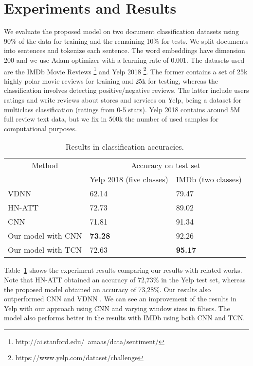 \documentclass[runningheads]{llncs}
\begin{document}
\section{Experiments and Results}
We evaluate the proposed model on two document classification datasets using 90\% of the data for training and the remaining 10\% for tests. We split documents into sentences and tokenize each sentence. The word embeddings have dimension 200 and we use Adam optimizer with a learning rate of 0.001. The datasets used are the IMDb Movie Reviews \footnote{http://ai.stanford.edu/~amaas/data/sentiment/} and Yelp 2018 \footnote{https://www.yelp.com/dataset/challenge}. The former contains a set of 25k highly polar movie reviews for training and 25k for testing, whereas the classification involves detecting positive/negative reviews. The latter include users ratings and write reviews about stores and services on Yelp, being a dataset for multiclass classification (ratings from 0-5 stars). Yelp 2018 contains around 5M full review text data, but we fix in 500k the number of used samples for computational purposes.\\[-12mm]

\begin{table}[!h]
\caption{Results in classification accuracies.}
\centering
\begin{tabular}{@{}p{}*{2}{p{}}@{}}
\toprule
\multicolumn{1}{c}{Method} & \multicolumn{2}{c}{Accuracy on test set}  \\
\cmidrule(r{4pt}){2-3} 
& Yelp 2018 (five classes) & IMDb (two classes)  \\
\midrule
VDNN \cite{c31} & 62.14 & 79.47 \\
HN-ATT  \cite{c1} & 72.73 &  89.02 \\
CNN  \cite{c13} & 71.81 &  91.34 \\
Our model with CNN & \textbf{73.28} & 92.26\\
Our model with TCN & 72.63 & \textbf{95.17} \\
\bottomrule
\end{tabular}
\label{tabela1}
\end{table}

\vspace{-4mm}

Table~\ref{tabela1} shows the experiment results comparing our results with related works. Note that HN-ATT \cite{c1} obtained an accuracy of 72,73\% in the Yelp test set, whereas the proposed model obtained an accuracy of 73,28\%. Our results also outperformed CNN \cite{c1} and VDNN \cite{c31}. We can see an improvement of the results in Yelp with our approach using CNN and varying window sizes in filters. The model also performs better in the results with IMDb using both CNN and TCN.
\end{document}
